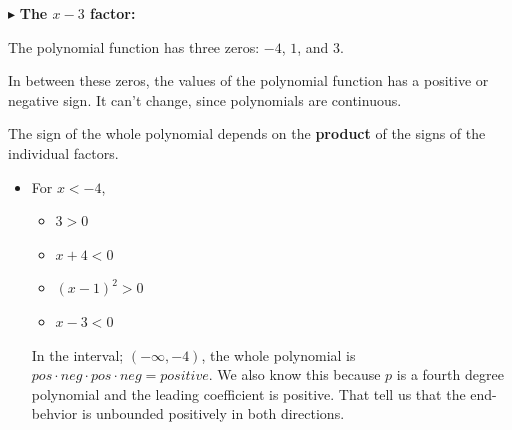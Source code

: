 \documentclass{ximera}
\begin{document}
\begin{example}
$\blacktriangleright$ \textbf{The $x-3$ factor:}

\begin{image}
  \end{image}


The polynomial function has three zeros: $-4$, $1$, and $3$. 

In between these zeros, the values of the polynomial function has a positive or negative sign. It can't change, since polynomials are continuous. 

The sign of the whole polynomial depends on the \textbf{\textcolor{purple!85!blue}{product}} of the signs of the individual factors.



\begin{itemize}
\item For $x < -4$, 
\begin{itemize}
  \item $3 > 0$
  \item $x+4 < 0$
  \item $(x-1)^2 > 0$
  \item $x-3 < 0$ 
\end{itemize}
In the interval; $(-\infty, -4)$, the whole polynomial is $pos \cdot neg \cdot pos \cdot neg = positive$.  We also know this because $p$ is a fourth degree polynomial and the leading coefficient is positive. That tell us that the end-behvior is unbounded positively in both directions.



\end{itemize}
\end{example}
\end{document}
